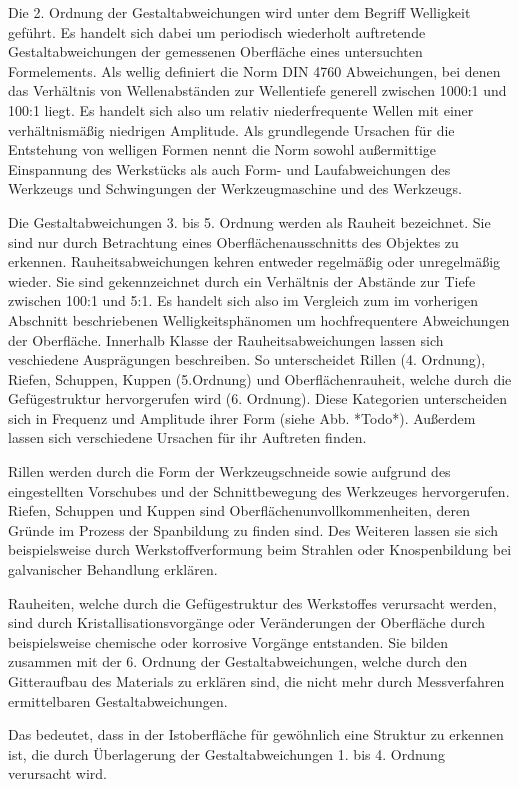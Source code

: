 Die 2. Ordnung der Gestaltabweichungen wird unter dem Begriff Welligkeit geführt. Es handelt sich dabei um periodisch wiederholt auftretende Gestaltabweichungen der gemessenen Oberfläche eines untersuchten Formelements. Als wellig definiert die Norm DIN 4760 Abweichungen, bei denen das Verhältnis von Wellenabständen zur Wellentiefe generell zwischen 1000:1 und 100:1 liegt. Es handelt sich also um relativ niederfrequente Wellen mit einer verhältnismäßig niedrigen Amplitude. Als grundlegende Ursachen für die Entstehung von welligen Formen nennt die Norm sowohl außermittige Einspannung des Werkstücks als auch Form- und Laufabweichungen des Werkzeugs und Schwingungen der Werkzeugmaschine und des Werkzeugs.

Die Gestaltabweichungen 3. bis 5. Ordnung werden als Rauheit bezeichnet. Sie sind nur durch Betrachtung eines Oberflächenausschnitts des Objektes zu erkennen. Rauheitsabweichungen kehren entweder regelmäßig oder unregelmäßig wieder. Sie sind gekennzeichnet durch ein Verhältnis der Abstände zur Tiefe zwischen 100:1 und 5:1. Es handelt sich also im Vergleich zum im vorherigen Abschnitt beschriebenen Welligkeitsphänomen um hochfrequentere Abweichungen der Oberfläche. 
Innerhalb Klasse der Rauheitsabweichungen lassen sich veschiedene Ausprägungen beschreiben. So unterscheidet Rillen (4. Ordnung), Riefen, Schuppen, Kuppen (5.Ordnung) und Oberflächenrauheit, welche durch die Gefügestruktur hervorgerufen wird (6. Ordnung).
Diese Kategorien unterscheiden sich in Frequenz und Amplitude ihrer Form (siehe Abb. *Todo*). Außerdem lassen sich verschiedene Ursachen für ihr Auftreten finden. 

Rillen werden durch die Form der Werkzeugschneide sowie aufgrund des eingestellten Vorschubes und der Schnittbewegung des Werkzeuges hervorgerufen.
Riefen, Schuppen und Kuppen sind Oberflächenunvollkommenheiten, deren Gründe im Prozess der Spanbildung zu finden sind. Des Weiteren lassen sie sich beispielsweise durch Werkstoffverformung beim Strahlen oder Knospenbildung bei galvanischer Behandlung erklären. 

Rauheiten, welche durch die Gefügestruktur des Werkstoffes verursacht werden, sind durch Kristallisationsvorgänge oder Veränderungen der Oberfläche durch beispielsweise chemische oder korrosive Vorgänge entstanden. Sie bilden zusammen mit der 6. Ordnung der Gestaltabweichungen, welche durch den Gitteraufbau des Materials zu erklären sind, die nicht mehr durch Messverfahren ermittelbaren Gestaltabweichungen. 

Das bedeutet, dass in der Istoberfläche für gewöhnlich eine Struktur zu erkennen ist, die durch Überlagerung der Gestaltabweichungen 1. bis 4. Ordnung verursacht wird. 

